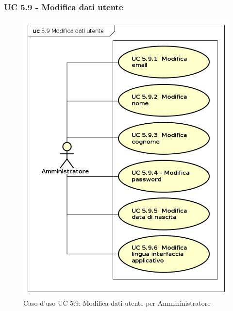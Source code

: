 \subsubsection{UC 5.9 - Modifica dati utente}
\begin{figure}[H]
	\centering
	\includegraphics[width=12cm, keepaspectratio]{img/UC59.png} 
	\caption{Caso d'uso UC 5.9:  Modifica dati utente per Ammininistratore}\label{fig:411}
\end{figure}
